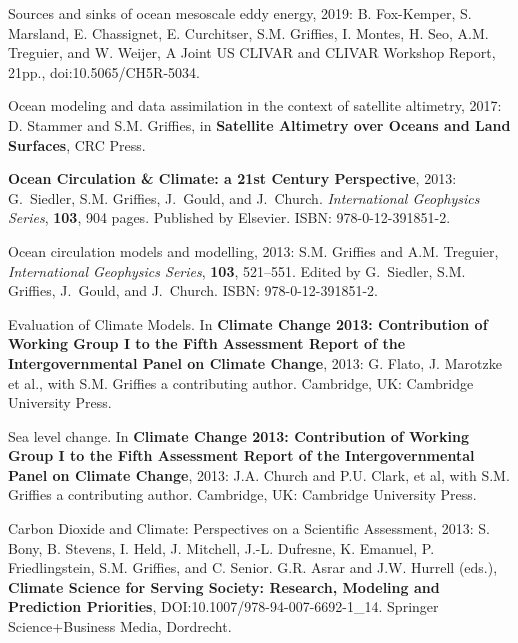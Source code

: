 \begin{etaremune}


\item Sources and sinks of ocean mesoscale eddy energy, 2019: B. Fox-Kemper,  S. Marsland, E. Chassignet, E. Curchitser, S.M. Grif\/f\/ies, I. Montes, H. Seo, A.M. Treguier, and W. Weijer, A Joint US CLIVAR and CLIVAR Workshop Report, 21pp., doi:10.5065/CH5R-5034.

\item Ocean modeling and data assimilation in the context of satellite altimetry, 2017: D. Stammer and S.M. Grif\/f\/ies, in  {\bf Satellite Altimetry over Oceans and Land Surfaces}, CRC Press.
  
\item {\bf Ocean Circulation \& Climate: a 21st Century Perspective}, 2013: G.\ Siedler, S.M. Grif\/f\/ies, J.\ Gould, and J.\ Church.
  {\it International Geophysics Series}, {\bf 103}, 904 pages. Published by Elsevier.  ISBN: 978-0-12-391851-2.

\item Ocean circulation models and modelling, 2013: S.M. Grif\/f\/ies and A.M. Treguier, {\it International Geophysics Series}, {\bf 103}, 521--551.  Edited by G.\ Siedler, S.M. Grif\/f\/ies, J.\ Gould, and J.\ Church.  ISBN:
  978-0-12-391851-2.

\item Evaluation of Climate Models.  In {\bf Climate Change 2013: Contribution of Working Group I to the Fifth Assessment Report of
    the Intergovernmental Panel on Climate Change}, 2013: G. Flato,
  J. Marotzke et al., with S.M. Grif\/f\/ies a contributing author. Cambridge, UK: Cambridge University Press.

\item Sea level change.  In {\bf Climate Change 2013: Contribution of Working Group I to the Fifth Assessment Report of the Intergovernmental Panel on Climate Change}, 2013: J.A. Church and P.U. Clark, et al, with S.M. Grif\/f\/ies a contributing author.  Cambridge, UK: Cambridge University Press.

\item Carbon Dioxide and Climate: Perspectives on a Scientific
  Assessment, 2013: S. Bony, B. Stevens, I. Held, J. Mitchell,
  J.-L. Dufresne, K. Emanuel, P. Friedlingstein, S.M. Grif\/f\/ies, and C. Senior. G.R. Asrar and J.W. Hurrell
  (eds.), {\bf Climate Science for Serving Society: Research, Modeling and Prediction Priorities}, DOI:10.1007/978-94-007-6692-1\_14.
  Springer Science+Business Media, Dordrecht.


\end{etaremune}
